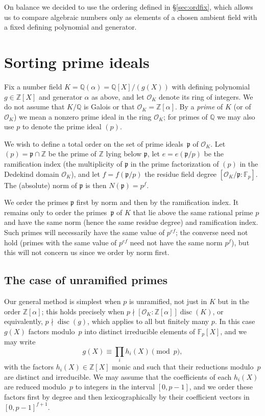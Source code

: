 \documentclass{article}
\def\Sage{{\tt Sage}}
\def\Z{{\mathbb Z}}
\def\Q{{\mathbb Q}}
\def\F{{\mathbb F}}
\def\Fp{{\mathbb F}_p}
\def\OO{{\mathcal O}}
\def\p{{\mathfrak p}}
\DeclareMathOperator{\disc}{disc}
\begin{document}
On balance we decided to use the ordering defined in \S\ref{sec:ordfix}, which allows us to compare algebraic numbers only as elements of a chosen ambient field with a fixed defining polynomial and generator.

\section{Sorting prime ideals}\label{sec:primes}
Fix a number field $K=\Q(\alpha)=\Q[X]/(g(X))$ with defining
polynomial $g\in\Z[X]$ and generator $\alpha$ as above, and let
$\OO_K$ denote its ring of integers.  We do not assume that $K/\Q$ is
Galois or that $\OO_K=\Z[\alpha]$.  By a \emph{prime} of $K$ (or of
$\OO_K$) we mean a nonzero prime ideal in the ring $\OO_K$; for primes
of $\Q$ we may also use $p$ to denote the prime ideal $(p)$.

We wish to define a total order on the set of prime ideals~$\p$
of $\OO_K$.  Let $(p)=\p\cap \Z$ be the prime of $\Z$ lying below $\p$,
let $e=e(\p/p)$ be the ramification index (the multiplicity of $\p$ in the prime factorization of $(p)$ in the Dedekind domain $\OO_K$), and let $f=f(\p/p)$ the residue field degree $[\OO_K/\p:\F_p]$.
The (absolute) norm of $\p$ is then $N(\p)=p^f$.


We order the primes $\p$ first by norm and then by the ramification
index.  It remains only to order the primes~$\p$ of $K$ that lie above
the same rational prime $p$ and have the same norm (hence the same
residue degree) and ramification index.  Such primes will necessarily
have the same value of $p^{ef}$; the converse need not hold (primes
with the same value of $p^{ef}$ need not have the same norm $p^{f}$),
but this will not concern us since we order by norm first.

\subsection{The case of unramified primes}

Our general method is simplest when $p$ is unramified, not just in $K$
but in the order $\Z[\alpha]$; this holds precisely when $p\nmid
[\OO_K:\Z[\alpha]]\disc(K)$, or equivalently, $p\nmid\disc(g)$, which
applies to all but finitely many $p$.  In this case $g(X)$ factors
modulo~$p$ into distinct irreducible elements of $\Fp[X]$, and we may
write
\[
    g(X) \equiv \prod_i h_i(X) \pmod{p},
\]
with the factors $h_i(X)\in\Z[X]$ monic and such that their reductions
modulo~$p$ are distinct and irreducible.  We may assume that the
coefficients of each $h_i(X)$ are reduced modulo~$p$ to integers in the interval $[0,p-1]$, and we order these factors first by degree and then lexicographically by their coefficient vectors in $[0,p-1]^{f+1}$.
\end{document}
